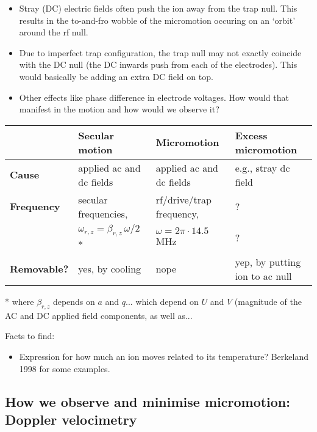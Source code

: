 \documentclass{article}
\begin{document}
\begin{itemize}
\item Stray (DC) electric fields often push the ion away from the trap null. This results in the to-and-fro wobble of the micromotion occuring on an `orbit' around the rf null.
\item Due to imperfect trap configuration, the trap null may not exactly coincide with the DC null (the DC inwards push from each of the electrodes). This would basically be adding an extra DC field on top.
\item Other effects like phase difference in electrode voltages. How would that manifest in the motion and how would we observe it?  
\end{itemize}

\vspace{0mm}
\begin{center}
\begin{tabular}{l l l l} \toprule
& \textbf{Secular motion} & \textbf{Micromotion} & \textbf{Excess micromotion} \\ \midrule
\textbf{Cause} & applied ac and dc fields & applied ac and dc fields & e.g., stray dc field \\
\textbf{Frequency} & secular frequencies, & rf/drive/trap frequency, & ? \\
 & $\omega_{r, z} = \beta_{r,z} \, \omega /2$ *&  $\omega = 2 \pi \cdot 14.5$ MHz & ? \\
\textbf{Removable?} & yes, by cooling & nope & yep, by putting ion to ac null \\
\bottomrule
\end{tabular}
\end{center}

\vspace{2mm}

* where $\beta_{r,z}$ depends on $a$ and $q$... which depend on $U$ and $V$ (magnitude of the AC and DC applied field components, as well as...


\vspace{5mm} \noindent Facts to find:

\begin{itemize}
\item Expression for how much an ion moves related to its temperature? Berkeland 1998 for some examples.
\end{itemize}


\subsection*{How we observe and minimise micromotion: Doppler velocimetry}
\end{document}
